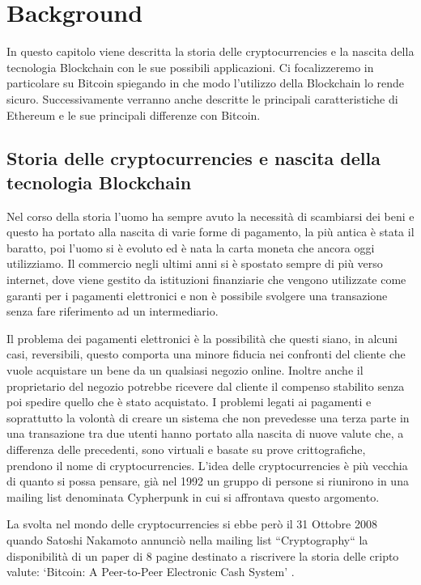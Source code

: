 \documentclass[12pt]{report}
\begin{document}
\chapter{Background}

In questo capitolo viene descritta la storia delle cryptocurrencies e la nascita della tecnologia Blockchain con le sue possibili applicazioni.
Ci focalizzeremo in particolare su Bitcoin spiegando in che modo l'utilizzo della Blockchain lo rende sicuro. 
Successivamente verranno anche descritte le principali caratteristiche di Ethereum e le sue principali differenze con Bitcoin.

\section{Storia delle cryptocurrencies e nascita della tecnologia Blockchain}

Nel corso della storia l'uomo ha sempre avuto la necessità di scambiarsi dei beni e questo ha portato alla nascita di varie forme di pagamento, la più antica è stata il baratto, poi l'uomo si è evoluto ed è nata la carta moneta che ancora oggi utilizziamo.
Il commercio negli ultimi anni si è spostato sempre di più verso internet, dove viene gestito da istituzioni finanziarie che vengono utilizzate come garanti per i pagamenti elettronici e non è possibile svolgere una transazione senza fare riferimento ad un intermediario.

Il problema dei pagamenti elettronici è la possibilità che questi siano, in alcuni casi, reversibili, questo comporta una minore fiducia nei confronti del cliente che vuole acquistare un bene da un qualsiasi negozio online.
Inoltre anche il proprietario del negozio potrebbe ricevere dal cliente il compenso stabilito senza poi spedire quello che è stato acquistato.
I problemi legati ai pagamenti e soprattutto la volontà di creare un sistema che non prevedesse una terza parte in una transazione tra due utenti hanno portato alla nascita di nuove valute che, a differenza delle precedenti, sono virtuali e basate su prove crittografiche, prendono il nome di cryptocurrencies.
L'idea delle cryptocurrencies è più vecchia di quanto si possa pensare, già nel 1992 un gruppo di persone si riunirono in una mailing list denominata Cypherpunk \cite{Cypherpunk} in cui si affrontava questo argomento.

La svolta nel mondo delle cryptocurrencies si ebbe però il 31 Ottobre 2008 quando Satoshi Nakamoto annunciò nella mailing list ``Cryptography`` la disponibilità di un paper di 8 pagine destinato a riscrivere la storia delle cripto valute: ‘Bitcoin: A Peer-to-Peer Electronic Cash System' \cite{BitcoinWhitePaper}.
\end{document}
